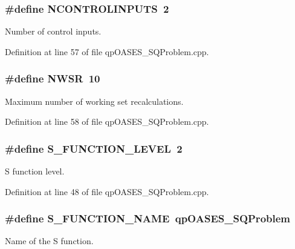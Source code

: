 \subsubsection[{NCONTROLINPUTS}]{\setlength{\rightskip}{0pt plus 5cm}\#define NCONTROLINPUTS~2}\label{qpOASES__SQProblem_8cpp_ab559b6bb26aeb10ecdf5654acc204535}
Number of control inputs. 

Definition at line 57 of file qpOASES\_\-SQProblem.cpp.

\subsubsection[{NWSR}]{\setlength{\rightskip}{0pt plus 5cm}\#define NWSR~10}\label{qpOASES__SQProblem_8cpp_ad4a923bb7993bc9620756fd92bc2cf57}
Maximum number of working set recalculations. 

Definition at line 58 of file qpOASES\_\-SQProblem.cpp.

\subsubsection[{S\_\-FUNCTION\_\-LEVEL}]{\setlength{\rightskip}{0pt plus 5cm}\#define S\_\-FUNCTION\_\-LEVEL~2}\label{qpOASES__SQProblem_8cpp_a9a4ab27953070e39249f3fad28e93749}
S function level. 

Definition at line 48 of file qpOASES\_\-SQProblem.cpp.

\subsubsection[{S\_\-FUNCTION\_\-NAME}]{\setlength{\rightskip}{0pt plus 5cm}\#define S\_\-FUNCTION\_\-NAME~qpOASES\_\-SQProblem}\label{qpOASES__SQProblem_8cpp_a0f61df833e166c743295eebf43f0b142}
Name of the S function. 

